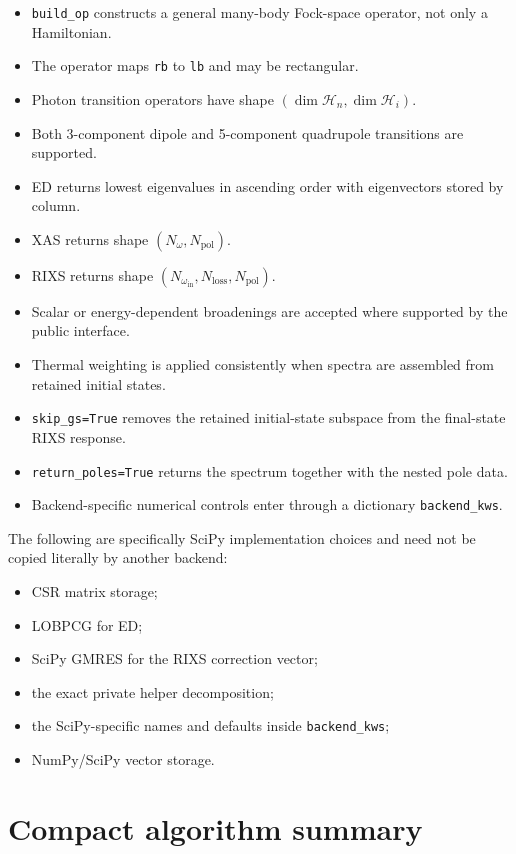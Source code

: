 \documentclass[11pt]{article}
\begin{document}
\begin{itemize}
  \item \texttt{build\_op} constructs a general many-body Fock-space operator, not only a Hamiltonian.
  \item The operator maps \texttt{rb} to \texttt{lb} and may be rectangular.
  \item Photon transition operators have shape \((\dim\mathcal H_n,\dim\mathcal H_i)\).
  \item Both 3-component dipole and 5-component quadrupole transitions are supported.
  \item ED returns lowest eigenvalues in ascending order with eigenvectors stored by column.
  \item XAS returns shape \((N_{\omega},N_{\mathrm{pol}})\).
  \item RIXS returns shape \((N_{\omega_{\mathrm{in}}},N_{\mathrm{loss}},N_{\mathrm{pol}})\).
  \item Scalar or energy-dependent broadenings are accepted where supported by the public interface.
  \item Thermal weighting is applied consistently when spectra are assembled from retained initial states.
  \item \texttt{skip\_gs=True} removes the retained initial-state subspace from the final-state RIXS response.
  \item \texttt{return\_poles=True} returns the spectrum together with the nested pole data.
  \item Backend-specific numerical controls enter through a dictionary \texttt{backend\_kws}.
\end{itemize}

The following are specifically SciPy implementation choices and need not be copied literally by another backend:

\begin{itemize}
  \item CSR matrix storage;
  \item LOBPCG for ED;
  \item SciPy GMRES for the RIXS correction vector;
  \item the exact private helper decomposition;
  \item the SciPy-specific names and defaults inside \texttt{backend\_kws};
  \item NumPy/SciPy vector storage.
\end{itemize}

\section{Compact algorithm summary}
\end{document}
